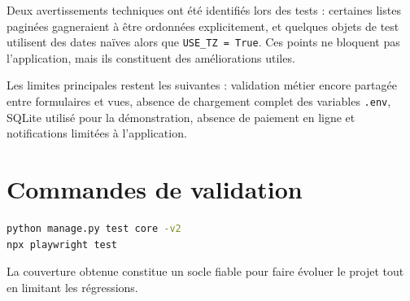 Deux avertissements techniques ont été identifiés lors des tests : certaines listes paginées gagneraient à être ordonnées explicitement, et quelques objets de test utilisent des dates naïves alors que \texttt{USE\_TZ = True}. Ces points ne bloquent pas l'application, mais ils constituent des améliorations utiles.

Les limites principales restent les suivantes : validation métier encore partagée entre formulaires et vues, absence de chargement complet des variables \texttt{.env}, SQLite utilisé pour la démonstration, absence de paiement en ligne et notifications limitées à l'application.

\section{Commandes de validation}

\begin{lstlisting}[language=bash,caption={Commandes de test}]
python manage.py test core -v2
npx playwright test
\end{lstlisting}

La couverture obtenue constitue un socle fiable pour faire évoluer le projet tout en limitant les régressions.
